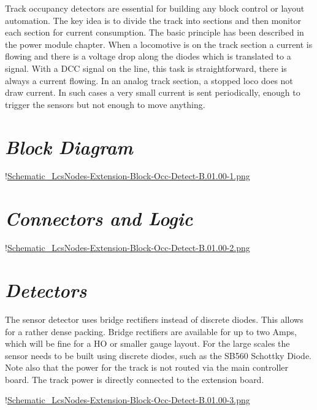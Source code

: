 
Track occupancy detectors are essential for building any block control or layout automation. The key idea is to divide the track into sections and then monitor each section for current consumption. The basic principle has been described in the power module chapter. When a locomotive is on the track section a current is flowing and there is a voltage drop along the diodes which is translated to a signal. With a DCC signal on the line, this task is straightforward, there is always a current flowing. In an analog track section, a stopped loco does not draw current. In such cases a very small current is sent periodically, enough to trigger the sensors but not enough to move anything.\textbf{}

\section{\textit{Block Diagram}}

!\href{./Schematics/Schematic_LcsNodes-Extension-Block-Occ-Detect-B.01.00-1.png }{Schematic_LcsNodes-Extension-Block-Occ-Detect-B.01.00-1.png}

\section{\textit{Connectors and Logic}}

!\href{./Schematics/Schematic_LcsNodes-Extension-Block-Occ-Detect-B.01.00-2.png }{Schematic_LcsNodes-Extension-Block-Occ-Detect-B.01.00-2.png}

\section{\textit{Detectors}}

The sensor detector uses bridge rectifiers instead of discrete diodes. This allows for a rather dense packing. Bridge rectifiers are available for up to two Amps, which will be fine for a HO or smaller gauge layout. For the large scales the sensor needs to be built using discrete diodes, such as the SB560 Schottky Diode. Note also that the power for the track is not routed via the main controller board. The track power is directly connected to the extension board.

!\href{./Schematics/Schematic_LcsNodes-Extension-Block-Occ-Detect-B.01.00-3.png }{Schematic_LcsNodes-Extension-Block-Occ-Detect-B.01.00-3.png}

